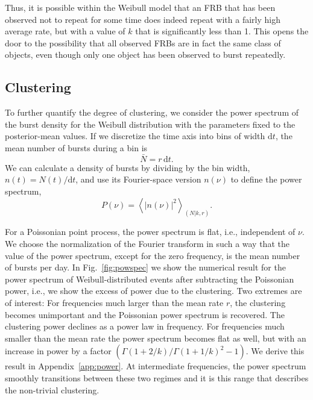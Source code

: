 \documentclass[fleqn,usenatbib]{mnras}
\newcommand{\new}[1]{#1}
\begin{document}
\new{Thus, it is possible within the Weibull model that an FRB that has been observed not to repeat for some time does indeed repeat with a fairly high average rate, but with a value of $k$ that is significantly less than 1. This opens the door to the possibility that all observed FRBs are in fact the same class of objects, even though only one object has been observed to burst repeatedly.}


\subsection{Clustering}
\label{sec:clustering}

\new{To further quantify the degree of clustering, we consider the power spectrum of the burst density for the Weibull distribution with the parameters fixed to the posterior-mean values. If we discretize the time axis into bins of width $\mathrm{d}t$, the mean number of bursts during a bin is
\begin{equation}
	\bar{N} = r\,\mathrm{d}t.
\end{equation}
We can calculate a density of bursts by dividing by the bin width, $n(t) = N(t)/\mathrm{d}t$, and use its Fourier-space version $n(\nu)$ to define the power spectrum,
\begin{equation}
	P(\nu) = \left< \left|n(\nu)\right|^2 \right>_{(N|k,r)}.
\end{equation}}

\new{For a Poissonian point process, the power spectrum is flat, i.e., independent of $\nu$. We choose the normalization of the Fourier transform in such a way that the value of the power spectrum, except for the zero frequency, is the mean number of bursts per day. In Fig.~\ref{fig:powspec} we show the numerical result for the power spectrum of Weibull-distributed events after subtracting the Poissonian power, i.e., we show the excess of power due to the clustering. Two extremes are of interest: For frequencies much larger than the mean rate $r$, the clustering becomes unimportant and the Poissonian power spectrum is recovered. The clustering power declines as a power law in frequency. For frequencies much smaller than the mean rate the power spectrum becomes flat as well, but with an increase in power by a factor $(\Gamma(1 + 2/k)/\Gamma(1 + 1/k)^2 - 1)$. We derive this result in Appendix~\ref{app:power}. At intermediate frequencies, the power spectrum smoothly transitions between these two regimes and it is this range that describes the non-trivial clustering.}
\end{document}
